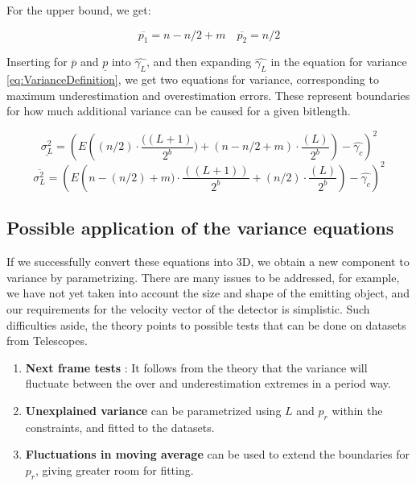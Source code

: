 \documentclass[notitlepage]{article}
\begin{document}
For the upper bound, we get:

\begin{equation}
\overline{p_1} = n- n/2 + m \quad \overline{p_2}		 = 	n/2
\end{equation}

Inserting for $\overline{p}$ and $\underline{p}$ into $\hat{\gamma_L}$, and then expanding $\hat{\gamma_L}$ in the equation for variance \eqref{eq:VarianceDefinition}, we get two equations for variance, corresponding to maximum underestimation and overestimation errors. These represent boundaries for how much additional variance can be caused for a given bitlength. 

\begin{equation}
\underline{\sigma_L^2} 
 = \left(E\left((n / 2)  \cdot \frac{((L+1)}{2^b})
  + (n - n/2   +m) \cdot \frac{( L )}{2^b} \right) - \hat{\gamma_c} \right)^2
	\label{eq:TwinkleVariance3}
\end{equation}
\begin{equation}
\overline{\sigma_L^2}
	 = \left(E\left(n-(n / 2) + m) \cdot \frac{((L+1))}{2^b} + (n/2   ) \cdot \frac{( L )}{2^b} \right)- \hat{\gamma_c} \right)^2
	\label{eq:TwinkleVariance4}
\end{equation}



\subsection{Possible application of the variance equations}
If we successfully convert these equations into 3D, we obtain a new component to variance by parametrizing. There are many issues to be addressed, for example, we have not yet taken into account the size and shape of the emitting object, and our requirements for the velocity vector of the detector is simplistic. Such difficulties aside, the theory points to possible tests that can be done on datasets from Telescopes.

\begin{enumerate}
\item \textbf{Next frame tests} : It follows from the theory that the  variance will fluctuate between the over and underestimation extremes in a period way. 
\item \textbf{Unexplained variance} can be parametrized using $L$ and $p_r$ within the constraints, and fitted to the datasets.
\item \textbf{Fluctuations in moving average} can be used to extend the boundaries for $p_r$, giving greater room for fitting.
\end{enumerate}
\end{document}
